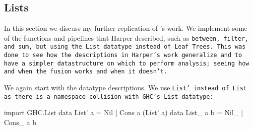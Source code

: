 \long{}
\subsection{Lists}
In this section we discuss my further replication of \cite{Harper2011}'s work.
We implement some of the functions and pipelines that Harper described, such as \tt{between}, \tt{filter}, and \tt{sum}, but using the List datatype instead of Leaf Trees.
This was done to see how the descriptions in Harper's work generalize and to have a simpler datastructure on which to perform analysis; seeing how and when the fusion works and when it doesn't.

We again start with the datatype descriptions. We use \tt{List'} instead of \tt{List} as there is a namespace collision with GHC's \tt{List} datatype:
\begin{code}
import GHC.List
data List' a = Nil | Cons a (List' a)
data List_ a b = Nil_ | Cons_ a b
\end{code}
